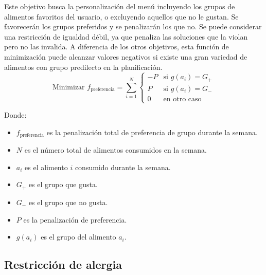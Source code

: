 Este objetivo busca la personalización del menú incluyendo los grupos de alimentos favoritos del usuario, o excluyendo aquellos que no le gustan. Se favorecerán los grupos preferidos y se penalizarán los que no. Se puede considerar una restricción de igualdad débil, ya que penaliza las soluciones que la violan pero no las invalida. A diferencia de los otros objetivos, esta función de minimización puede alcanzar valores negativos si existe una gran variedad de alimentos con grupo predilecto en la planificación.
\[
\text{Minimizar } f_{\text{preferencia}} = \sum_{i=1}^{N}
\begin{cases} 
-P & \text{si } g(a_i) = G_+ \\
P & \text{si } g(a_i) = G_- \\
0 & \text{en otro caso}
\end{cases}
\]
\begin{small}
    Donde:
    \begin{itemize}
    \item \( f_{\text{preferencia}} \) es la penalización total de preferencia de grupo durante la semana.
    \item \( N \) es el número total de alimentos consumidos en la semana.
    \item \( a_i \) es el alimento \( i \) consumido durante la semana.
    \item \( G_+ \) es el grupo que gusta.
    \item \( G_- \) es el grupo que no gusta.
    \item \( P \) es la penalización de preferencia.
    \item \( g(a_i) \) es el grupo del alimento \( a_i \).
    \end{itemize}
\end{small}

\subsection{Restricción de alergia}

